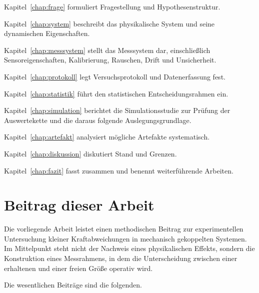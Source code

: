 \documentclass[12pt,a4paper]{report}
\begin{document}
Kapitel~\ref{chap:frage} formuliert Fragestellung und Hypothesenstruktur.

Kapitel~\ref{chap:system} beschreibt das physikalische System und seine dynamischen
Eigenschaften.

Kapitel~\ref{chap:messsystem} stellt das Messsystem dar, einschließlich
Sensoreigenschaften, Kalibrierung, Rauschen, Drift und Unsicherheit.

Kapitel~\ref{chap:protokoll} legt Versuchsprotokoll und Datenerfassung fest.

Kapitel~\ref{chap:statistik} führt den statistischen Entscheidungsrahmen ein.

Kapitel~\ref{chap:simulation} berichtet die Simulationsstudie zur Prüfung der Auswertekette
und die daraus folgende Auslegungsgrundlage.

Kapitel~\ref{chap:artefakt} analysiert mögliche Artefakte systematisch.

Kapitel~\ref{chap:diskussion} diskutiert Stand und Grenzen.

Kapitel~\ref{chap:fazit} fasst zusammen und benennt weiterführende Arbeiten.

\section{Beitrag dieser Arbeit}
\label{sec:beitrag}

Die vorliegende Arbeit leistet einen methodischen Beitrag zur
experimentellen Untersuchung kleiner Kraftabweichungen in mechanisch
gekoppelten Systemen. Im Mittelpunkt steht nicht der Nachweis eines
physikalischen Effekts, sondern die Konstruktion eines Messrahmens, in
dem die Unterscheidung zwischen einer erhaltenen und einer freien Größe
operativ wird.

Die wesentlichen Beiträge sind die folgenden.
\end{document}

